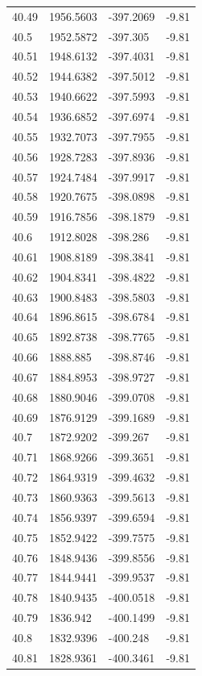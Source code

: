 \begin{table}[H]
\begin{tabular}{llll}
40.49 & 1956.5603 & -397.2069 & -9.81 \\
40.5 & 1952.5872 & -397.305 & -9.81 \\
40.51 & 1948.6132 & -397.4031 & -9.81 \\
40.52 & 1944.6382 & -397.5012 & -9.81 \\
40.53 & 1940.6622 & -397.5993 & -9.81 \\
40.54 & 1936.6852 & -397.6974 & -9.81 \\
40.55 & 1932.7073 & -397.7955 & -9.81 \\
40.56 & 1928.7283 & -397.8936 & -9.81 \\
40.57 & 1924.7484 & -397.9917 & -9.81 \\
40.58 & 1920.7675 & -398.0898 & -9.81 \\
40.59 & 1916.7856 & -398.1879 & -9.81 \\
40.6 & 1912.8028 & -398.286 & -9.81 \\
40.61 & 1908.8189 & -398.3841 & -9.81 \\
40.62 & 1904.8341 & -398.4822 & -9.81 \\
40.63 & 1900.8483 & -398.5803 & -9.81 \\
40.64 & 1896.8615 & -398.6784 & -9.81 \\
40.65 & 1892.8738 & -398.7765 & -9.81 \\
40.66 & 1888.885 & -398.8746 & -9.81 \\
40.67 & 1884.8953 & -398.9727 & -9.81 \\
40.68 & 1880.9046 & -399.0708 & -9.81 \\
40.69 & 1876.9129 & -399.1689 & -9.81 \\
40.7 & 1872.9202 & -399.267 & -9.81 \\
40.71 & 1868.9266 & -399.3651 & -9.81 \\
40.72 & 1864.9319 & -399.4632 & -9.81 \\
40.73 & 1860.9363 & -399.5613 & -9.81 \\
40.74 & 1856.9397 & -399.6594 & -9.81 \\
40.75 & 1852.9422 & -399.7575 & -9.81 \\
40.76 & 1848.9436 & -399.8556 & -9.81 \\
40.77 & 1844.9441 & -399.9537 & -9.81 \\
40.78 & 1840.9435 & -400.0518 & -9.81 \\
40.79 & 1836.942 & -400.1499 & -9.81 \\
40.8 & 1832.9396 & -400.248 & -9.81 \\
40.81 & 1828.9361 & -400.3461 & -9.81 \\

\end{tabular}
\end{table}
